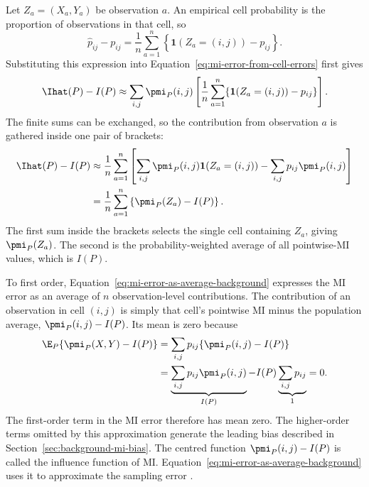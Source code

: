Let \(Z_a=(X_a,Y_a)\) be observation \(a\). An empirical cell probability is
the proportion of observations in that cell, so
\begin{equation}
  \widehat p_{ij}-p_{ij}
  =
  \frac{1}{n}\sum_{a=1}^{n}
  \left\{\mathbf 1(Z_a=(i,j))-p_{ij}\right\}.
  \label{eq:cell-error-as-average}
\end{equation}
Substituting this expression into Equation~\eqref{eq:mi-error-from-cell-errors}
first gives
\begin{equation}
  \Ihat(P)-I(P)
  \approx
  \sum_{i,j}\pmi_P(i,j)
  \left[
    \frac{1}{n}\sum_{a=1}^{n}
    \{\mathbf 1(Z_a=(i,j))-p_{ij}\}
  \right].
  \label{eq:mi-error-double-sum-background}
\end{equation}
The finite sums can be exchanged, so the contribution from observation \(a\)
is gathered inside one pair of brackets:
\begin{align}
  \Ihat(P)-I(P)
  &\approx
  \frac{1}{n}\sum_{a=1}^{n}
  \left[
    \sum_{i,j}\pmi_P(i,j)\mathbf 1(Z_a=(i,j))
    -\sum_{i,j}p_{ij}\pmi_P(i,j)
  \right]
  \notag\\
  &=\frac{1}{n}\sum_{a=1}^{n}
  \left\{\pmi_P(Z_a)-I(P)\right\}.
  \label{eq:mi-error-as-average-background}
\end{align}
The first sum inside the brackets selects the single cell containing
\(Z_a\), giving \(\pmi_P(Z_a)\). The second is the probability-weighted
average of all pointwise-MI values, which is \(I(P)\).

To first order, Equation~\eqref{eq:mi-error-as-average-background} expresses
the MI error as an average of \(n\) observation-level contributions.
The contribution of an observation in cell \((i,j)\) is simply that cell's
pointwise MI minus the population average, \(\pmi_P(i,j)-I(P)\). Its mean is
zero because
\begin{align}
  \E_P\{\pmi_P(X,Y)-I(P)\}
  &=\sum_{i,j}p_{ij}\{\pmi_P(i,j)-I(P)\}
  \notag\\
  &=\underbrace{\sum_{i,j}p_{ij}\pmi_P(i,j)}_{I(P)}
    -I(P)\underbrace{\sum_{i,j}p_{ij}}_{1}
  =0.
  \label{eq:mi-if-mean-zero-background}
\end{align}
The first-order term in the MI error therefore has mean zero. The higher-order
terms omitted by this approximation generate the leading bias described in
Section~\ref{sec:background-mi-bias}.
The centred function \(\pmi_P(i,j)-I(P)\) is called the influence function
of MI\@. Equation~\eqref{eq:mi-error-as-average-background} uses it to
approximate the sampling error \citep{hampel1974,vanderVaart1998,kandasamy2015}.

